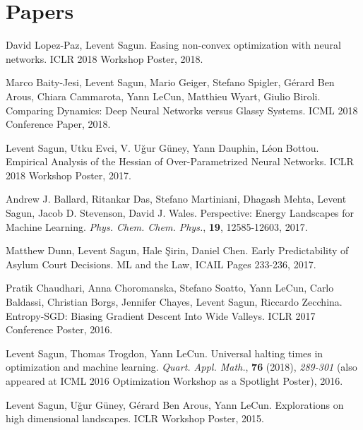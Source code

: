 \documentclass[10pt,letterpaper]{article}
\renewenvironment{itemize}
{
\begin{list}{}{\setlength{\leftmargin}{1.5em}}
}
{
  \end{list}
}
\begin{document}
\section*{Papers}
\begin{itemize}
\item David Lopez-Paz, Levent Sagun. Easing non-convex optimization with neural networks. ICLR 2018 Workshop Poster, 2018.

\item Marco Baity-Jesi, Levent Sagun, Mario Geiger, Stefano Spigler, G\'erard Ben Arous, Chiara Cammarota, Yann LeCun, Matthieu Wyart, Giulio Biroli. Comparing Dynamics: Deep Neural Networks versus Glassy Systems. ICML 2018 Conference Paper, 2018.

\item Levent Sagun, Utku Evci, V. U\u{g}ur G\"uney, Yann Dauphin, L\'eon Bottou. Empirical Analysis of the Hessian of Over-Parametrized Neural Networks. ICLR 2018 Workshop Poster, 2017.

\item Andrew J. Ballard, Ritankar Das, Stefano Martiniani, Dhagash Mehta, Levent Sagun, Jacob D. Stevenson, David J. Wales. Perspective: Energy Landscapes for Machine Learning. \textit{Phys. Chem. Chem. Phys.}, \textbf{19}, 12585-12603, 2017.

\item Matthew Dunn, Levent Sagun, Hale \c{S}irin, Daniel Chen. Early Predictability of Asylum Court Decisions. ML and the Law, ICAIL Pages 233-236, 2017.

\item Pratik Chaudhari, Anna Choromanska, Stefano Soatto, Yann LeCun, Carlo Baldassi, Christian Borgs, Jennifer Chayes, Levent Sagun, Riccardo Zecchina. Entropy-SGD: Biasing Gradient Descent Into Wide Valleys. ICLR 2017 Conference Poster, 2016.

\item  Levent Sagun, Thomas Trogdon, Yann LeCun. Universal halting times in optimization and machine learning. \textit{Quart. Appl. Math.}, \textbf{76} (2018), \textit{289-301} (also appeared at ICML 2016 Optimization Workshop as a Spotlight Poster), 2016.


\item  Levent Sagun, U\u{g}ur G\"uney, G\'erard Ben Arous, Yann LeCun. Explorations on high dimensional landscapes. ICLR Workshop Poster, 2015.
\end{itemize}
\end{document}
